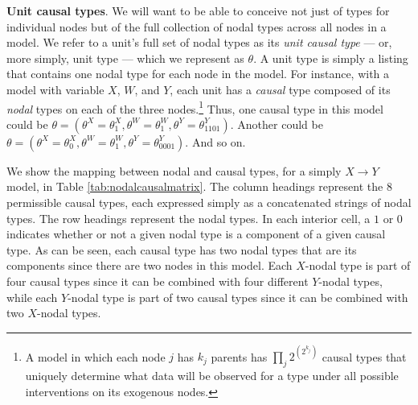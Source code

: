 \documentclass[
  12pt,
]{book}
\begin{document}
\textbf{Unit causal types}. We will want to be able to conceive not just of types for individual nodes but of the full collection of nodal types across all nodes in a model. We refer to a unit's full set of nodal types as its \emph{unit causal type} --- or, more simply, unit type --- which we represent as \(\theta\). A unit type is simply a listing that contains one nodal type for each node in the model. For instance, with a model with variable \(X\), \(W\), and \(Y\), each unit has a \emph{causal} type composed of its \emph{nodal} types on each of the three nodes.\footnote{A model in which each node \(j\) has \(k_j\) parents has \(\prod_j2^{\left(2^{k_j}\right)}\) causal types that uniquely determine what data will be observed for a type under all possible interventions on its exogenous nodes.} Thus, one causal type in this model could be \(\theta = (\theta^X = \theta^X_1, \theta^W = \theta^W_1, \theta^Y = \theta^Y_{1101})\). Another could be \(\theta = (\theta^X = \theta^X_0, \theta^W = \theta^W_1, \theta^Y = \theta^Y_{0001})\). And so on.

We show the mapping between nodal and causal types, for a simply \(X \rightarrow Y\) model, in Table \ref{tab:nodalcausalmatrix}. The column headings represent the \(8\) permissible causal types, each expressed simply as a concatenated strings of nodal types. The row headings represent the nodal types. In each interior cell, a \(1\) or \(0\) indicates whether or not a given nodal type is a component of a given causal type. As can be seen, each causal type has two nodal types that are its components since there are two nodes in this model. Each \(X\)-nodal type is part of four causal types since it can be combined with four different \(Y\)-nodal types, while each \(Y\)-nodal type is part of two causal types since it can be combined with two \(X\)-nodal types.
\end{document}
